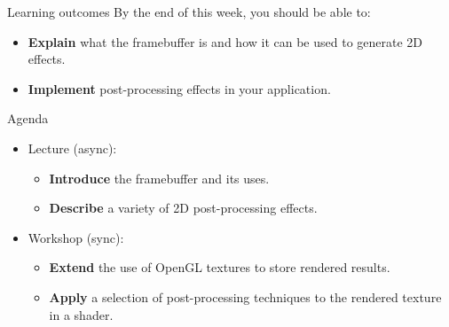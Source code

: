 \begin{frame}{Learning outcomes}
	By the end of this week, you should be able to:
	\begin{itemize}
		\item \textbf{Explain} what the framebuffer is and how it can be used to generate 2D effects.
		\item \textbf{Implement} post-processing effects in your application.
	\end{itemize}
\end{frame}

\begin{frame}{Agenda}
	\begin{itemize}
		\pause\item Lecture (async):
		\begin{itemize}
			\item \textbf{Introduce} the framebuffer and its uses.
			\item \textbf{Describe} a variety of 2D post-processing effects.
		\end{itemize}
		\pause\item Workshop (sync):
		\begin{itemize}
			\item \textbf{Extend} the use of OpenGL textures to store rendered results.
			\item \textbf{Apply} a selection of post-processing techniques to the rendered texture in a shader.
		\end{itemize}
	\end{itemize}
\end{frame}